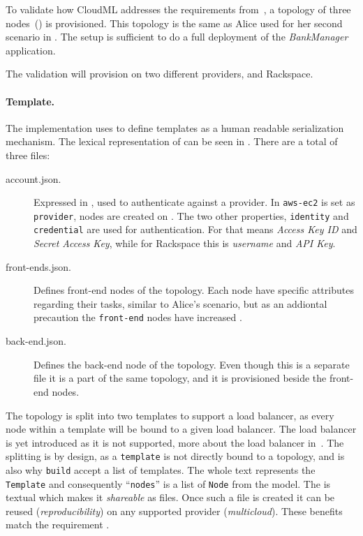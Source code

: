 
To validate how CloudML addresses the requirements from~,
a topology of three nodes~() is provisioned.
This topology is the same as Alice used for her second scenario in .
The setup is sufficient to do a full deployment of the \emph{BankManager} application.

The validation will provision on two different providers,  and Rackspace.

\paragraph{Template.}



The implementation uses  to define templates as a human readable serialization mechanism.
The lexical representation of  can be seen in .
There are a total of three files:
\begin{description}
  \item[account.json.]
    Expressed in , used to authenticate against a provider.
    In  \texttt{aws-ec2} is set as \texttt{provider},
    \ie nodes are created on .
    The two other properties, \texttt{identity} and \texttt{credential} are used for authentication.
    For  that means \emph{Access Key ID} and \emph{Secret Access Key},
    while for Rackspace this is \emph{username} and \emph{API Key}.
  \item[front-ends.json.]
    Defines front-end nodes of the topology.
    Each node have specific attributes regarding their tasks, similar to Alice's scenario,
    but as an addiontal precaution the \texttt{front-end} nodes have increased .
  \item[back-end.json.]
    Defines the back-end node of the topology.
    Even though this is a separate file it is a part of the same topology,
    and it is provisioned beside the front-end nodes.
\end{description}
The topology is split into two templates to support a load balancer,
as every node within a template will be bound to a given load balancer.
The load balancer is yet introduced as it is not supported, more about the load balancer in~.
The splitting is by design, as a \texttt{template} is not directly bound to a topology,
and is also why \texttt{build} accept a list of templates.
The whole text represents the \texttt{Template} and consequently 
``\texttt{nodes}'' is a list of \texttt{Node} from the model.
The  is textual which makes it \emph{shareable} as files.
Once such a file is created it can be reused (\emph{reproducibility}) 
on any supported provider (\emph{multicloud}).
These benefits match the requirement .

